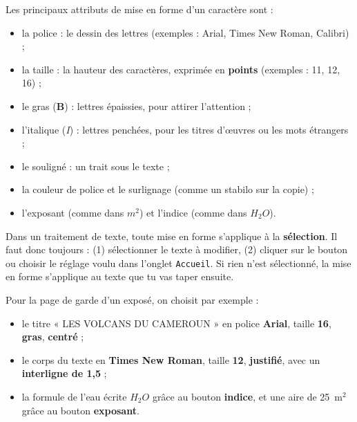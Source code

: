 \documentclass[11pt]{article}
\newcommand{\cle}[1]{{\popxbold\color{popdark}#1}}
\begin{document}
\begin{definition}
Les principaux attributs de mise en forme d'un caractère sont :
\begin{itemize}
\item la \cle{police} : le dessin des lettres (exemples : Arial, Times New Roman, Calibri) ;
\item la \cle{taille} : la hauteur des caractères, exprimée en \textbf{points} (exemples : 11, 12, 16) ;
\item le \cle{gras} (\textbf{B}) : lettres épaissies, pour attirer l'attention ;
\item l'\cle{italique} (\emph{I}) : lettres penchées, pour les titres d'œuvres ou les mots étrangers ;
\item le \cle{souligné} : un trait sous le texte ;
\item la \cle{couleur} de police et le \cle{surlignage} (comme un stabilo sur la copie) ;
\item l'\cle{exposant} (comme dans $m^2$) et l'\cle{indice} (comme dans $H_2O$).
\end{itemize}
\end{definition}

\begin{propriete}
Dans un traitement de texte, toute mise en forme s'applique à la \textbf{sélection}. Il faut donc toujours : (1) sélectionner le texte à modifier, (2) cliquer sur le bouton ou choisir le réglage voulu dans l'onglet \texttt{Accueil}. Si rien n'est sélectionné, la mise en forme s'applique au texte que tu vas taper ensuite.
\end{propriete}

\begin{exemplebox}
Pour la page de garde d'un exposé, on choisit par exemple :
\begin{itemize}
\item le titre « LES VOLCANS DU CAMEROUN » en police \textbf{Arial}, taille \textbf{16}, \textbf{gras}, \textbf{centré} ;
\item le corps du texte en \textbf{Times New Roman}, taille \textbf{12}, \textbf{justifié}, avec un \textbf{interligne de 1,5} ;
\item la formule de l'eau écrite $H_2O$ grâce au bouton \textbf{indice}, et une aire de 25~m$^2$ grâce au bouton \textbf{exposant}.
\end{itemize}
\end{exemplebox}
\end{document}
